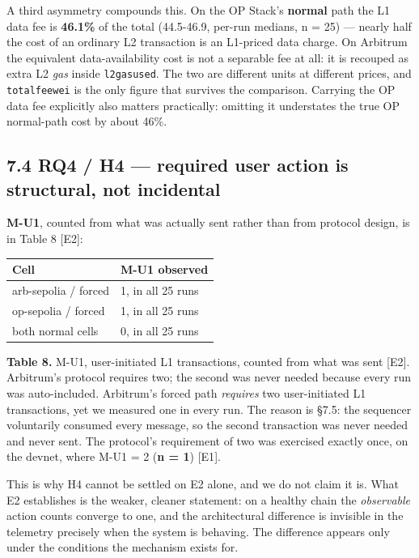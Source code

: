 \documentclass[conference]{IEEEtran}
\renewcommand{\_}{\textunderscore\allowbreak}
\begin{document}
A third asymmetry compounds this. On the OP Stack's \textbf{normal} path
the L1 data fee is \textbf{46.1\%} of the total (44.5-46.9, per-run
medians, n = 25) --- nearly half the cost of an ordinary L2 transaction
is an L1-priced data charge. On Arbitrum the equivalent
data-availability cost is not a separable fee at all: it is recouped as
extra L2 \emph{gas} inside \texttt{l2\_gas\_used}. The two are different
units at different prices, and \texttt{total\_fee\_wei} is the only
figure that survives the comparison. Carrying the OP data fee explicitly
also matters practically: omitting it understates the true OP
normal-path cost by about 46\%.

\subsection{7.4 RQ4 / H4 --- required user action is structural, not
incidental}\label{rq4-h4-required-user-action-is-structural-not-incidental}

\textbf{M-U1}, counted from what was actually sent rather than from
protocol design, is in Table 8 {[}E2{]}:

\begin{table}[!t]
\centering
\small
\begin{tabular}{@{}ll@{}}
\toprule
Cell & M-U1 observed \\
\midrule
arb-sepolia / forced & 1, in all 25 runs \\
op-sepolia / forced & 1, in all 25 runs \\
both normal cells & 0, in all 25 runs \\
\bottomrule
\end{tabular}
\par\vspace{5pt}
{\footnotesize\raggedright \textbf{Table 8.} M-U1, user-initiated L1 transactions, counted from
what was sent {[}E2{]}. Arbitrum's protocol requires two; the second was
never needed because every run was auto-included. Arbitrum's forced path
\emph{requires} two user-initiated L1 transactions, yet we measured one
in every run. The reason is §7.5: the sequencer voluntarily consumed
every message, so the second transaction was never needed and never
sent. The protocol's requirement of two was exercised exactly once, on
the devnet, where M-U1 = 2 (\textbf{n = 1}) {[}E1{]}.\par}
\end{table}

This is why H4 cannot be settled on E2 alone, and we do not claim it is.
What E2 establishes is the weaker, cleaner statement: on a healthy chain
the \emph{observable} action counts converge to one, and the
architectural difference is invisible in the telemetry precisely when
the system is behaving. The difference appears only under the conditions
the mechanism exists for.
\end{document}
